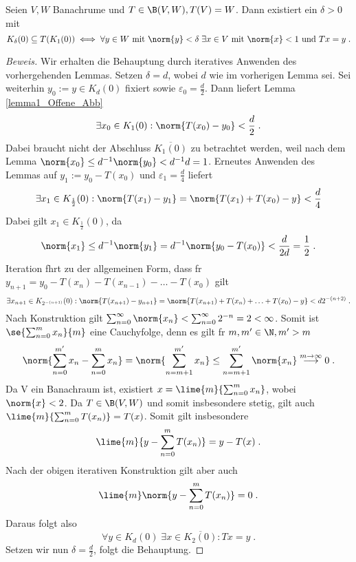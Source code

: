\begin{theorem}
\begin{lemma}
	Seien \(V,W\) Banachr\as ume und \(T\in \B(V,W), T(V) = W\). Dann existiert ein \(\delta > 0\) mit 
	\[K_\delta(0) \subseteq T(K_1(0)) \iff \forall y\in W \text{ mit }\norm{y}<\delta \;\exists x\in V \text{ mit } \norm{x} < 1 \text{ und } Tx = y\;.\]
	\label{lemma2_Offene_Abb}
\end{lemma}
\begin{proof}[Beweis]
	Wir erhalten die Behauptung durch iteratives Anwenden des vorhergehenden Lemmas. Setzen \(\delta = d\), wobei $d$ wie im vorherigen Lemma sei. Sei weiterhin \(y_0:=y\in K_d(0)\) fixiert sowie \(\varepsilon_0 = \frac{d}{2}\). Dann liefert Lemma \ref{lemma1_Offene_Abb}
	\[\exists x_0 \in K_1(0): \norm{T(x_0) - y_0} < \frac{d}{2}\;.\]
	Dabei braucht nicht der Abschluss \(\overline{K_1(0)}\) zu betrachtet werden, weil nach dem Lemma \(\norm{x_0} \leq d^{-1} \norm{y_0} < d^{-1} d =1\). Erneutes Anwenden des Lemmas auf \(y_1:= y_0 -T(x_0)\) und \(\varepsilon_1 = \frac{d}{4}\) liefert
	\[\exists x_1 \in K_{\frac{1}{2}}(0): \norm{T(x_1) - y_1} = \norm{T(x_1) + T(x_0) - y} < \frac{d}{4}\]
	Dabei gilt \(x_1 \in K_{\frac{1}{2}}(0)\), da
	\[\norm{x_1} \leq d^{-1} \norm{y_1} = d^{-1} \norm{y_0 -T(x_0)} < \frac{d}{2d} = \frac{1}{2}\;.\]
	Iteration f\us hrt zu der allgemeinen Form, dass f\us r \(y_{n+1} = y_0 - T(x_n) -T(x_{n-1})- \ldots - T(x_0)\) gilt
	\[\exists x_{n+1} \in K_{2^{-(n+1)}}(0): \norm{T(x_{n+1})-y_{n+1}} =\norm{T(x_{n+1}) + T(x_n) + \ldots + T(x_0) - y} < d 2^{-(n+2)}\;.\]
	Nach Konstruktion gilt \(\sum_{n=0}^\infty \norm{x_n} < \sum_{n=0}^{\infty} 2^{-n} = 2 < \infty\). Somit ist \(\se{\sum_{n=0}^m x_n}{m}\) eine Cauchyfolge, denn es gilt f\us r \(m,m'\in \N, m' > m\)
	\[ \norm{\sum_{n=0}^{m'} x_n - \sum_{n=0}^{m} x_n} = \norm{\sum_{n=m+1}^{m'} x_n} \leq \sum_{n=m+1}^{m'} \norm{x_n} \overset{m\to\infty}{\longrightarrow} 0 \;.\]
	Da V ein Banachraum ist, existiert \(x = \lime{m}{\sum_{n=0}^m x_n}\), wobei \(\norm{x} < 2\). Da \(T\in \B(V,W)\) und somit insbesondere stetig, gilt auch \(\lime{m}{\sum_{n=0}^m T(x_n)} = T(x)\).
	Somit gilt insbesondere
	\[\lime{m}{y-\sum_{n=0}^m T(x_n)} = y - T(x)\;.\]
	Nach der obigen iterativen Konstruktion gilt aber auch
	\[\lime{m}\norm{y - \sum_{n=0}^m T(x_n)} = 0\;.\]
	Daraus folgt also 
	\[\forall y \in K_d(0) \;\exists x \in \overline{K_2(0)}: Tx = y\;.\]
	Setzen wir nun \(\delta = \frac{d}{2}\), folgt die Behauptung.	
\end{proof}


\end{theorem}
